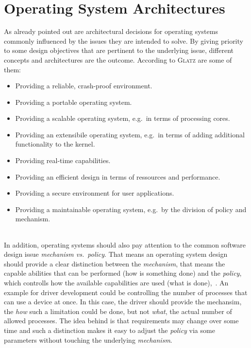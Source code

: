 %
% 
%


\section{Operating System Architectures}\label{sec:kernel-arch-concepts}

As already pointed out are architectural decisions for operating systems commonly influenced by the issues they are intended to solve.
By giving priority to some design objectives that are pertinent to the underlying issue, different concepts and architectures are the outcome.
According to \textsc{Glatz}\cite{glatz2015betriebssysteme} are some of them:
\begin{itemize}
    \item Providing a reliable, crash-proof environment.
    \item Providing a portable operating system.
    \item Providing a scalable operating system, e.g.\ in terms of processing cores.
    \item Providing an extensibile operating system, e.g.\ in terms of adding additional functionality to the kernel.
    \item Providing real-time capabilities.
    \item Providing an efficient design in terms of ressources and performance.
    \item Providing a secure environment for user applications.
    \item Providing a maintainable operating system, e.g.\ by the division of policy and mechanism. 
\end{itemize}\ \\
%
In addition, operating systems should also pay attention to the common software design issue \textit{mechanism vs.\ policy}.
That means an operating system design should provide a clear distinction between the \textit{mechanism}, that means the capable abilities that can be performed (how is something done) and the \textit{policy}, which controlls how the available capabilities are used (what is done)\cite{lfd430},~\cite{silberschatz2009operating}.
An example for driver development could be controlling the number of processes that can use a device at once.
In this case, the driver should provide the mechansim, the \textit{how} such a limitation could be done, but not \textit{what}, the actual number of allowed processes. 
The idea behind is that requirements may change over some time and such a distinction makes it easy to adjust the \textit{policy} via some parameters without touching the underlying \textit{mechanism}\cite{silberschatz2009operating}.

